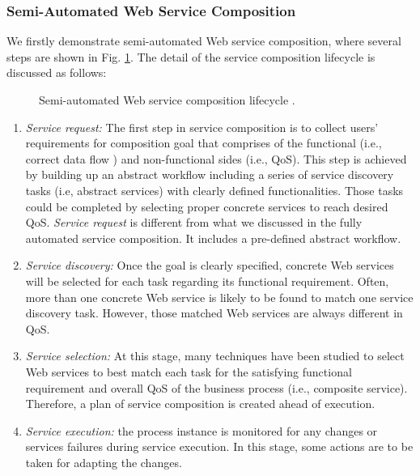 \subsubsection{Semi-Automated Web Service Composition}\label{lifecycle}
We firstly demonstrate semi-automated Web service composition, where several steps are shown in Fig. \ref{fig:lifecycle}. The detail of the service composition lifecycle is discussed as follows:

\begin{figure}
\centerline{
}
\caption{Semi-automated Web service composition lifecycle \cite{moghaddam2014service}.}
\label{fig:lifecycle}
\end{figure}

\begin{enumerate}
 \item \textit{Service request:} The first step in service composition is to collect users' requirements for composition goal that comprises of the functional (i.e., correct data flow ) and non-functional sides (i.e., QoS). This step is achieved by building up an abstract workflow including a series of service discovery tasks (i.e, abstract services) with clearly defined functionalities. Those tasks could be completed by selecting proper concrete services to reach desired QoS. \textit{Service request} is different from what we discussed in the fully automated service composition. It includes a pre-defined abstract workflow.
 \item \textit{Service discovery:} Once the goal is clearly specified, concrete Web services will be selected for each task regarding its functional requirement. Often, more than one concrete Web service is likely to be found to match one service discovery task. However, those matched Web services are always different in QoS.
 \item \textit{Service selection:} At this stage, many techniques have been studied to select Web services to best match each task for the satisfying functional requirement and overall QoS of the business process (i.e., composite service). Therefore, a plan of service composition is created ahead of execution.
 \item \textit{Service execution:} the process instance is monitored for any changes or services failures during service execution. In this stage, some actions are to be taken for adapting the changes.
\end{enumerate}

